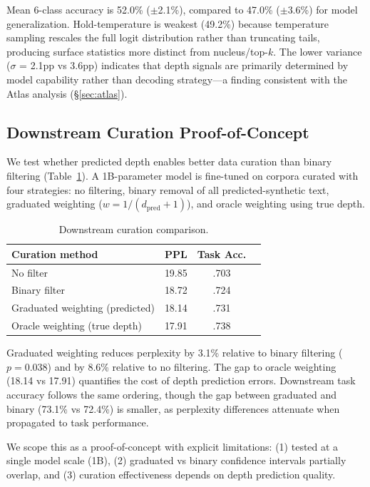 \documentclass[11pt,a4paper]{article}
\begin{document}
Mean 6-class accuracy is 52.0\% ($\pm$2.1\%), compared to 47.0\% ($\pm$3.6\%) for model generalization.
Hold-temperature is weakest (49.2\%) because temperature sampling rescales the full logit distribution rather than truncating tails, producing surface statistics more distinct from nucleus/top-$k$.
The lower variance ($\sigma$ = 2.1pp vs 3.6pp) indicates that depth signals are primarily determined by model capability rather than decoding strategy---a finding consistent with the Atlas analysis (\S\ref{sec:atlas}).

\subsection{Downstream Curation Proof-of-Concept}
\label{sec:curation}

We test whether predicted depth enables better data curation than binary filtering (Table~\ref{tab:curation}).
A 1B-parameter model is fine-tuned on corpora curated with four strategies: no filtering, binary removal of all predicted-synthetic text, graduated weighting ($w = 1/(d_{\text{pred}}+1)$), and oracle weighting using true depth.

\begin{table}[t]
\centering
\small
\caption{Downstream curation comparison.}
\label{tab:curation}
\begin{tabular}{@{}lccc@{}}
\toprule
\textbf{Curation method} & \textbf{PPL} & \textbf{Task Acc.} \\
\midrule
No filter & 19.85 & .703 \\
Binary filter & 18.72 & .724 \\
Graduated weighting (predicted) & 18.14 & .731 \\
Oracle weighting (true depth) & 17.91 & .738 \\
\bottomrule
\end{tabular}
\end{table}

Graduated weighting reduces perplexity by 3.1\% relative to binary filtering ($p=0.038$) and by 8.6\% relative to no filtering.
The gap to oracle weighting (18.14 vs 17.91) quantifies the cost of depth prediction errors.
Downstream task accuracy follows the same ordering, though the gap between graduated and binary (73.1\% vs 72.4\%) is smaller, as perplexity differences attenuate when propagated to task performance.

We scope this as a proof-of-concept with explicit limitations: (1) tested at a single model scale (1B), (2) graduated vs binary confidence intervals partially overlap, and (3) curation effectiveness depends on depth prediction quality.
\end{document}
